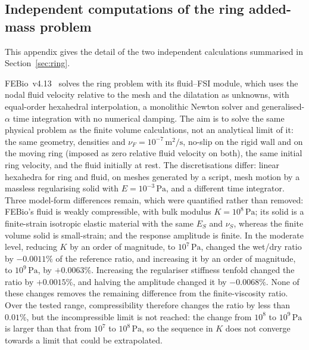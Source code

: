 \documentclass[sn-mathphys,Numbered]{sn-jnl}%
\renewcommand\paragraph[1]{\par\addvspace{1.2ex plus .4ex minus .2ex}%
	\noindent{\normalfont\bfseries #1}\hspace{0.5em}\ignorespaces}
\begin{document}
\begin{appendices}
\section{Independent computations of the ring added-mass problem}
\label{app:ring_independent}
This appendix gives the detail of the two independent calculations summarised in Section~\ref{sec:ring}.

\paragraph{FEBio: model.}
FEBio~v4.13~\citep{Maas2012,Ateshian2018,Shim2019} solves the ring problem with its fluid--FSI module, which uses the nodal fluid velocity relative to the mesh and the dilatation as unknowns, with equal-order hexahedral interpolation, a monolithic Newton solver and generalised-$\alpha$ time integration with no numerical damping.
The aim is to solve the same physical problem as the finite volume calculations, not an analytical limit of it: the same geometry, densities and $\nu_F=10^{-7}\,\mathrm{m^2/s}$, no-slip on the rigid wall and on the moving ring (imposed as zero relative fluid velocity on both), the same initial ring velocity, and the fluid initially at rest.
The discretisations differ: linear hexahedra for ring and fluid, on meshes generated by a script, mesh motion by a massless regularising solid with $E=10^{-3}\,\mathrm{Pa}$, and a different time integrator.
Three model-form differences remain, which were quantified rather than removed: FEBio's fluid is weakly compressible, with bulk modulus $K=10^{8}\,\mathrm{Pa}$; its solid is a finite-strain isotropic elastic material with the same $E_S$ and $\nu_S$, whereas the finite volume solid is small-strain; and the response amplitude is finite.
In the moderate level, reducing $K$ by an order of magnitude, to $10^{7}\,\mathrm{Pa}$, changed the wet/dry ratio by $-0.0011\%$ of the reference ratio, and increasing it by an order of magnitude, to $10^{9}\,\mathrm{Pa}$, by $+0.0063\%$.
Increasing the regulariser stiffness tenfold changed the ratio by $+0.0015\%$, and halving the amplitude changed it by $-0.0068\%$.
None of these changes removes the remaining difference from the finite-viscosity ratio.
Over the tested range, compressibility therefore changes the ratio by less than $0.01\%$, but the incompressible limit is not reached: the change from $10^{8}$ to $10^{9}\,\mathrm{Pa}$ is larger than that from $10^{7}$ to $10^{8}\,\mathrm{Pa}$, so the sequence in $K$ does not converge towards a limit that could be extrapolated.


\end{appendices}
\end{document}
